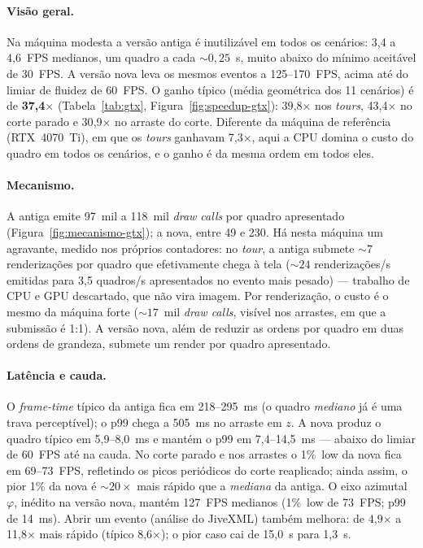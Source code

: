 \documentclass[11pt,a4paper]{article}
\begin{document}
\paragraph{Vis\~ao geral.}
Na m\'aquina modesta a vers\~ao antiga \'e inutiliz\'avel em todos os cen\'arios: 3{,}4 a
4{,}6~FPS medianos, um quadro a cada ${\sim}0{,}25$~s, muito abaixo do m\'inimo aceit\'avel de
30~FPS. A vers\~ao nova leva os mesmos eventos a 125--170~FPS, acima at\'e do limiar de fluidez
de 60~FPS. O ganho t\'ipico (m\'edia geom\'etrica dos 11 cen\'arios) \'e de
\textbf{37{,}4$\times$} (Tabela~\ref{tab:gtx}, Figura~\ref{fig:speedup-gtx}): 39{,}8$\times$ nos
\emph{tours}, 43{,}4$\times$ no corte parado e 30{,}9$\times$ no arraste do corte. Diferente da
m\'aquina de refer\^encia (RTX~4070~Ti), em que os \emph{tours} ganhavam 7{,}3$\times$, aqui a
CPU domina o custo do quadro em todos os cen\'arios, e o ganho \'e da mesma ordem em todos eles.

\paragraph{Mecanismo.}
A antiga emite 97~mil a 118~mil \emph{draw calls} por quadro apresentado
(Figura~\ref{fig:mecanismo-gtx}); a nova, entre 49 e 230. H\'a nesta m\'aquina um agravante,
medido nos pr\'oprios contadores: no \emph{tour}, a antiga submete ${\sim}7$ renderiza\c{c}\~oes
por quadro que efetivamente chega \`a tela (${\sim}24$ renderiza\c{c}\~oes/s emitidas para
3{,}5 quadros/s apresentados no evento mais pesado) --- trabalho de CPU e GPU descartado, que
n\~ao vira imagem. Por renderiza\c{c}\~ao, o custo \'e o mesmo da m\'aquina forte
(${\sim}17$~mil \emph{draw calls}, vis\'ivel nos arrastes, em que a submiss\~ao \'e 1:1). A
vers\~ao nova, al\'em de reduzir as ordens por quadro em duas ordens de grandeza, submete um
render por quadro apresentado.

\paragraph{Lat\^encia e cauda.}
O \emph{frame-time} t\'ipico da antiga fica em 218--295~ms (o quadro \emph{mediano} j\'a \'e
uma trava percept\'ivel); o p99 chega a 505~ms no arraste em $z$. A nova produz o quadro
t\'ipico em 5{,}9--8{,}0~ms e mant\'em o p99 em 7{,}4--14{,}5~ms --- abaixo do limiar de 60~FPS
at\'e na cauda. No corte parado e nos arrastes o 1\%~low da nova fica em 69--73~FPS, refletindo
os picos peri\'odicos do corte reaplicado; ainda assim, o pior 1\% da nova \'e
${\sim}20\times$ mais r\'apido que a \emph{mediana} da antiga. O eixo azimutal $\varphi$,
in\'edito na vers\~ao nova, mant\'em 127~FPS medianos (1\%~low de 73~FPS; p99 de 14~ms). Abrir
um evento (an\'alise do JiveXML) tamb\'em melhora: de 4{,}9$\times$ a 11{,}8$\times$ mais
r\'apido (t\'ipico 8{,}6$\times$); o pior caso cai de 15{,}0~s para 1{,}3~s.
\end{document}
